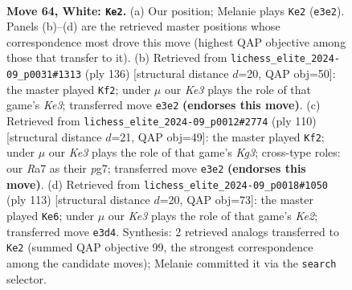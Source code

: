 \documentclass[11pt]{article}
\begin{document}
\clearpage

\begin{figure}[p]\centering
\begin{subfigure}{0.46\textwidth}\centering
\resizebox{\linewidth}{!}{%
\newchessgame
\chessboard[
  setfen={1R6/R4pk1/4p3/8/P3P3/r3KP2/8/8 w - - 19 64},
  showmover=false,
  pgfstyle=straightmove, color=movearrow, markmove={e3-e2}
]}
\caption{}
\end{subfigure}\hfill
\begin{subfigure}{0.46\textwidth}\centering
\resizebox{\linewidth}{!}{%
\newchessgame
\chessboard[
  setfen={8/8/4kp1R/8/4P1P1/3PK2P/8/4r3 w - - 1 69},
  showmover=false,
  pgfstyle=straightmove, color=movearrow, markmove={e3-f2}
]}
\caption{}
\end{subfigure}
\\[4pt]
\begin{subfigure}{0.46\textwidth}\centering
\resizebox{\linewidth}{!}{%
\newchessgame
\chessboard[
  setfen={8/4k1p1/4p2p/7P/4R1P1/5PK1/8/6r1 w - - 19 56},
  showmover=false,
  pgfstyle=straightmove, color=movearrow, markmove={g3-f2}
]}
\caption{}
\end{subfigure}\hfill
\begin{subfigure}{0.46\textwidth}\centering
\resizebox{\linewidth}{!}{%
\newchessgame
\chessboard[
  setfen={8/R3k3/2K2p2/2P5/4P3/8/1pr4p/8 b - - 5 57},
  showmover=false,
  pgfstyle=straightmove, color=movearrow, markmove={e7-e6}
]}
\caption{}
\end{subfigure}
\caption{\textbf{Move 64, White: \texttt{Ke2}.} (a) Our position; Melanie plays \texttt{Ke2} (\texttt{e3e2}). Panels (b)--(d) are the retrieved master positions whose correspondence most drove this move (highest QAP objective among those that transfer to it). (b) Retrieved from \texttt{lichess\_elite\_2024-09\_p0031\#1313} (ply 136) [structural distance $d$=20, QAP obj=50]: the master played \texttt{Kf2}; under $\mu$ our \emph{Ke3} plays the role of that game's \emph{Ke3}; transferred move \texttt{e3e2} \textbf{(endorses this move)}. (c) Retrieved from \texttt{lichess\_elite\_2024-09\_p0012\#2774} (ply 110) [structural distance $d$=21, QAP obj=49]: the master played \texttt{Kf2}; under $\mu$ our \emph{Ke3} plays the role of that game's \emph{Kg3}; cross-type roles: our \emph{R}a7 as their \emph{p}g7; transferred move \texttt{e3e2} \textbf{(endorses this move)}. (d) Retrieved from \texttt{lichess\_elite\_2024-09\_p0018\#1050} (ply 113) [structural distance $d$=20, QAP obj=73]: the master played \texttt{Ke6}; under $\mu$ our \emph{Ke3} plays the role of that game's \emph{Ke2}; transferred move \texttt{e3d4}. Synthesis: 2 retrieved analogs transferred to \texttt{Ke2} (summed QAP objective 99, the strongest correspondence among the candidate moves); Melanie committed it via the \texttt{search} selector.}
\label{fig:thought-m126}
\end{figure}
\end{document}
